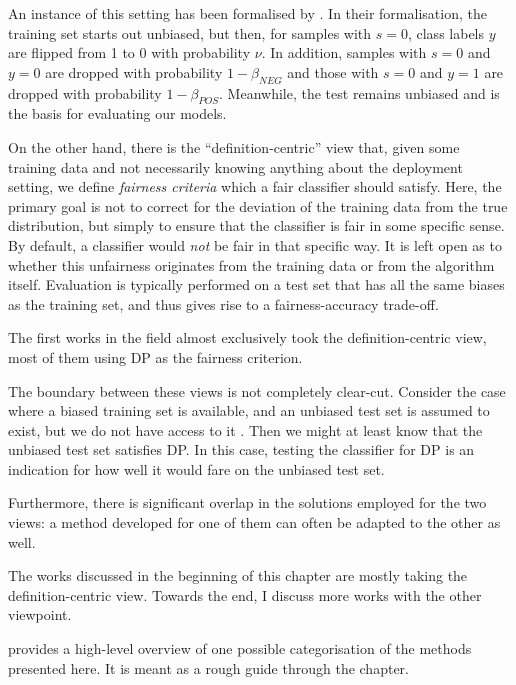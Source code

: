 
An instance of this setting has been formalised by \citet{blum2020recovering}.
In their formalisation, the training set starts out unbiased,
but then, for samples with \(s=0\), class labels \(y\) are flipped from 1 to 0 with probability \(\nu\).
In addition, samples with \(s=0\) and \(y=0\) are dropped with probability \(1-\beta_\mathit{NEG}\)
and those with \(s=0\) and \(y=1\) are dropped with probability \(1-\beta_\mathit{POS}\).
Meanwhile, the test remains unbiased and is the basis for evaluating our models.

On the other hand, there is the ``definition-centric'' view that,
given some training data and not necessarily knowing anything about the deployment setting,
we define \emph{fairness criteria} which a fair classifier should satisfy.
Here, the primary goal is not to correct for the deviation of the training data from the true distribution,
but simply to ensure that the classifier is fair in some specific sense.
By default, a classifier would \emph{not} be fair in that specific way.
It is left open as to whether this unfairness originates from the training data or from the algorithm itself.
Evaluation is typically performed on a test set that has all the same biases as the training set,
and thus gives rise to a fairness-accuracy trade-off.

The first works in the field almost exclusively took the definition-centric view,
most of them using \acf{DP} \citep{dwork2012fairness} as the fairness criterion.

The boundary between these views is not completely clear-cut.
Consider the case where a biased training set is available,
and an unbiased test set is assumed to exist, but we do not have access to it \citep{jiang2020identifying}.
Then we might at least know that the unbiased test set satisfies \ac{DP}.
In this case, testing the classifier for \ac{DP} is an indication
for how well it would fare on the unbiased test set.

Furthermore, there is significant overlap in the solutions employed for the two views:
a method developed for one of them can often be adapted to the other as well.

The works discussed in the beginning of this chapter are mostly taking the definition-centric view.
Towards the end, I discuss more works with the other viewpoint.

 provides a high-level overview
of one possible categorisation of the methods presented here.
It is meant as a rough guide through the chapter.

